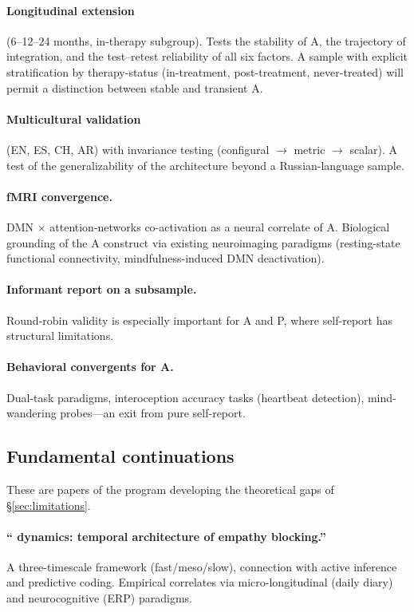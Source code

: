 \paragraph{Longitudinal extension} (6--12--24 months, in-therapy subgroup). Tests the stability of A, the trajectory of integration, and the test--retest reliability of all six factors. A sample with explicit stratification by therapy-status (in-treatment, post-treatment, never-treated) will permit a distinction between stable and transient A.

\paragraph{Multicultural validation} (EN, ES, CH, AR) with invariance testing (configural $\to$ metric $\to$ scalar). A test of the generalizability of the architecture beyond a Russian-language sample.

\paragraph{fMRI convergence.} DMN $\times$ attention-networks co-activation as a neural correlate of A. Biological grounding of the A construct via existing neuroimaging paradigms (resting-state functional connectivity, mindfulness-induced DMN deactivation).

\paragraph{Informant report on a subsample.} Round-robin validity is especially important for A and P, where self-report has structural limitations.

\paragraph{Behavioral convergents for A.} Dual-task paradigms, interoception accuracy tasks (heartbeat detection), mind-wandering probes---an exit from pure self-report.

\subsection{Fundamental continuations}

These are papers of the program developing the theoretical gaps of §\ref{sec:limitations}.

\paragraph{``\DEIC{} dynamics: temporal architecture of empathy blocking.''} A three-timescale framework (fast/meso/slow), connection with active inference and predictive coding. Empirical correlates via micro-longitudinal (daily diary) and neurocognitive (ERP) paradigms.

